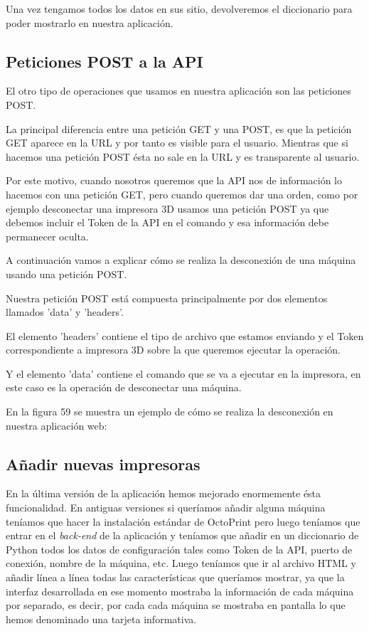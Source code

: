 Una vez tengamos todos los datos en sus sitio, devolveremos el diccionario para poder mostrarlo en nuestra aplicación.


\subsection{Peticiones POST a la API}

El otro tipo de operaciones que usamos en nuestra aplicación son las peticiones POST. 

La principal diferencia entre una petición GET y una POST, es que la petición GET aparece en la URL y por tanto es visible para el usuario. Mientras que si hacemos una petición POST ésta no sale en la URL y es transparente al usuario.

Por este motivo, cuando nosotros queremos que la API nos de información lo hacemos con una petición GET, pero cuando queremos dar una orden, como por ejemplo desconectar una impresora 3D usamos una petición POST ya que debemos  incluir el Token de la API en el comando y esa información debe permanecer oculta.

A continuación vamos a explicar cómo se realiza la desconexión de una máquina usando una petición POST.

Nuestra petición POST está compuesta principalmente por dos elementos llamados 'data' y 'headers'.

El elemento 'headers' contiene el tipo de archivo que estamos enviando y el Token correspondiente a impresora 3D sobre la que queremos ejecutar la operación.

Y el elemento 'data' contiene el comando que se va a ejecutar en la impresora, en este caso es la operación de desconectar una máquina.

En la figura 59 se muestra un ejemplo de cómo se realiza la desconexión en nuestra aplicación web:


\subsection{Añadir nuevas impresoras}

En la última versión de la aplicación hemos mejorado enormemente ésta funcionalidad. En antiguas versiones si queríamos añadir alguna máquina teníamos que hacer la instalación estándar de OctoPrint pero luego teníamos que entrar en el \textit{back-end} de la aplicación y teníamos que añadir en un diccionario de Python todos los datos de configuración tales como Token de la API, puerto de conexión, nombre de la máquina, etc. Luego teníamos que ir al archivo HTML y añadir línea a línea todas las características que queríamos mostrar, ya que la interfaz desarrollada en ese momento mostraba la información de cada máquina por separado, es decir, por cada cada máquina se mostraba en pantalla lo que hemos denominado una tarjeta informativa.

